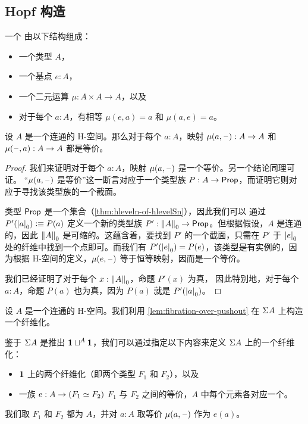\subsection{Hopf 构造}

\begin{defn}
  一个 
  由以下结构组成：
  \begin{itemize}
  \item 一个类型 $A$，
  \item 一个基点 $e:A$，
  \item 一个二元运算 $\mu:A\times A\to A$，以及
  \item 对于每个 $a:A$，有相等 $\mu(e,a)=a$ 和 $\mu(a,e)=a$。
  \end{itemize}
\end{defn}

\begin{lem}
  设 $A$ 是一个连通的 H-空间。那么对于每个 $a:A$，映射 $\mu(a,\blank):A\to
  A$ 和 $\mu(\blank,a):A\to A$ 都是等价。
\end{lem}

\begin{proof}
  我们来证明对于每个 $a:A$，映射 $\mu(a,\blank)$ 是一个等价。另一个结论同理可证。
  ``$\mu(a,\blank)$ 是等价''这一断言对应于一个类型族
  $P:A\to\prop$，而证明它则对应于寻找该类型族的一个截面。

  类型 $\prop$ 是一个集合（\cref{thm:hleveln-of-hlevelSn}），因此我们可以
  通过 $P'(\tproj0a)\defeq
  P(a)$ 定义一个新的类型族 $P':\trunc0A\to\prop$。但根据假设，$A$ 是连通的，因此 $\trunc0A$
  是可缩的。这蕴含着，要找到 $P'$ 的一个截面，只需在 $P'$ 于 $\tproj0e$ 处的纤维中找到一个点即可。而我们有
  $P'(\tproj0e)=P(e)$，该类型是有实例的，因为根据 H-空间的定义，$\mu(e,\blank)$ 等于恒等映射，因而是一个等价。

  我们已经证明了对于每个 $x:\trunc0A$，命题 $P'(x)$ 为真，
  因此特别地，对于每个 $a:A$，命题 $P(a)$ 也为真，因为
  $P(a)$ 就是 $P'(\tproj0a)$。
\end{proof}

\begin{defn}
  设 $A$ 是一个连通的 H-空间。我们利用
  \cref{lem:fibration-over-pushout} 在 $\susp A$ 上构造一个纤维化。

  鉴于 $\susp A$ 是推出 $\unit\sqcup^A\unit$，我们可以通过指定以下内容来定义 $\susp A$ 上的一个纤维化：
  \begin{itemize}
  \item $\unit$ 上的两个纤维化（即两个类型 $F_1$ 和 $F_2$），以及
  \item 一族 $e:A\to(\eqv{F_1}{F_2})$ $F_1$ 与 $F_2$ 之间的等价，$A$ 中每个元素各对应一个。
  \end{itemize}
  我们取 $F_1$ 和 $F_2$ 都为 $A$，并对 $a:A$ 取等价 $\mu(a,\blank)$ 作为 $e(a)$。
\end{defn}

